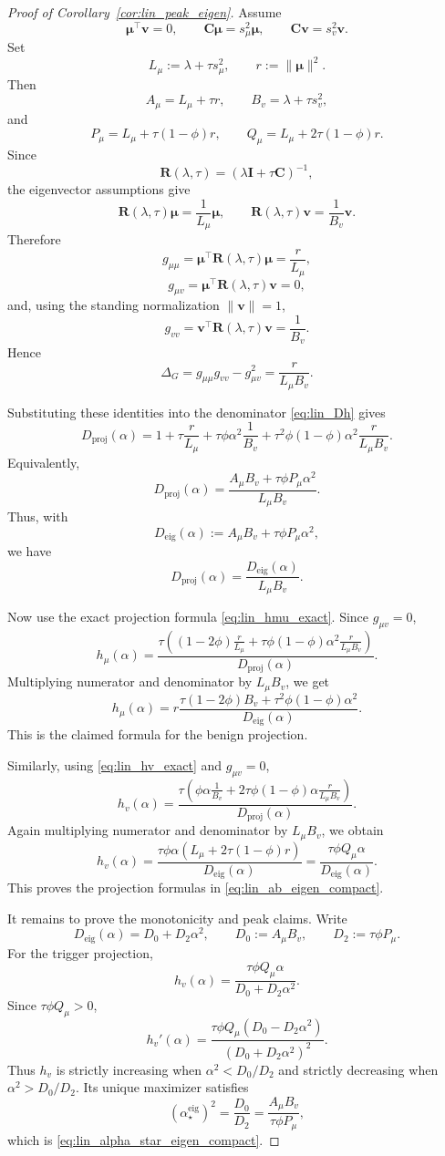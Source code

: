 \documentclass[10pt,a4paper]{amsart}
\newcommand{\C}{\mathbf{C}}
\newcommand{\I}{\mathbf{I}}
\newcommand{\bmu}{\boldsymbol{\mu}}
\newcommand{\bv}{\mathbf{v}}
\begin{document}
\begin{proof}[Proof of Corollary~\ref{cor:lin_peak_eigen}]
Assume
\[
\bmu^\top\bv=0,
\qquad
\C\bmu=s_\mu^2\bmu,
\qquad
\C\bv=s_v^2\bv.
\]
Set
\[
L_\mu:=\lambda+\tau s_\mu^2,
\qquad
r:=\|\bmu\|^2.
\]
Then
\[
A_\mu=L_\mu+\tau r,
\qquad
B_v=\lambda+\tau s_v^2,
\]
and
\[
P_\mu=L_\mu+\tau(1-\phi)r,
\qquad
Q_\mu=L_\mu+2\tau(1-\phi)r.
\]
Since
\[
\mathbf{R}(\lambda,\tau)=(\lambda\I+\tau\C)^{-1},
\]
the eigenvector assumptions give
\[
\mathbf{R}(\lambda,\tau)\bmu=\frac{1}{L_\mu}\bmu,
\qquad
\mathbf{R}(\lambda,\tau)\bv=\frac{1}{B_v}\bv.
\]
Therefore
\[
g_{\mu\mu}
=
\bmu^\top \mathbf{R}(\lambda,\tau)\bmu
=
\frac{r}{L_\mu},
\]
\[
g_{\mu v}
=
\bmu^\top \mathbf{R}(\lambda,\tau)\bv
=
0,
\]
and, using the standing normalization \(\|\bv\|=1\),
\[
g_{vv}
=
\bv^\top \mathbf{R}(\lambda,\tau)\bv
=
\frac{1}{B_v}.
\]
Hence
\[
\Delta_G=g_{\mu\mu}g_{vv}-g_{\mu v}^2
=
\frac{r}{L_\mu B_v}.
\]

Substituting these identities into the denominator
\eqref{eq:lin_Dh} gives
\[
D_{\mathrm{proj}}(\alpha)
=
1+\tau\frac{r}{L_\mu}
+
\tau\phi\alpha^2\frac{1}{B_v}
+
\tau^2\phi(1-\phi)\alpha^2\frac{r}{L_\mu B_v}.
\]
Equivalently,
\[
D_{\mathrm{proj}}(\alpha)
=
\frac{
A_\mu B_v+\tau\phi P_\mu\alpha^2
}
{L_\mu B_v}.
\]
Thus, with
\[
D_{\mathrm{eig}}(\alpha):=A_\mu B_v+\tau\phi P_\mu\alpha^2,
\]
we have
\[
D_{\mathrm{proj}}(\alpha)
=
\frac{D_{\mathrm{eig}}(\alpha)}{L_\mu B_v}.
\]

Now use the exact projection formula \eqref{eq:lin_hmu_exact}. Since
\(g_{\mu v}=0\),
\[
h_\mu(\alpha)
=
\frac{
\tau\left((1-2\phi)\frac{r}{L_\mu}
+
\tau\phi(1-\phi)\alpha^2\frac{r}{L_\mu B_v}\right)
}
{
D_{\mathrm{proj}}(\alpha)
}.
\]
Multiplying numerator and denominator by \(L_\mu B_v\), we get
\[
h_\mu(\alpha)
=
r
\frac{
\tau(1-2\phi)B_v+\tau^2\phi(1-\phi)\alpha^2
}
{
D_{\mathrm{eig}}(\alpha)
}.
\]
This is the claimed formula for the benign projection.

Similarly, using \eqref{eq:lin_hv_exact} and \(g_{\mu v}=0\),
\[
h_v(\alpha)
=
\frac{
\tau\left(
\phi\alpha\frac{1}{B_v}
+
2\tau\phi(1-\phi)\alpha\frac{r}{L_\mu B_v}
\right)
}
{
D_{\mathrm{proj}}(\alpha)
}.
\]
Again multiplying numerator and denominator by \(L_\mu B_v\), we obtain
\[
h_v(\alpha)
=
\frac{
\tau\phi\alpha
\left(L_\mu+2\tau(1-\phi)r\right)
}
{
D_{\mathrm{eig}}(\alpha)
}
=
\frac{
\tau\phi Q_\mu\alpha
}
{
D_{\mathrm{eig}}(\alpha)
}.
\]
This proves the projection formulas in \eqref{eq:lin_ab_eigen_compact}.

It remains to prove the monotonicity and peak claims. Write
\[
D_{\mathrm{eig}}(\alpha)=D_0+D_2\alpha^2,
\qquad
D_0:=A_\mu B_v,
\qquad
D_2:=\tau\phi P_\mu .
\]
For the trigger projection,
\[
h_v(\alpha)
=
\frac{\tau\phi Q_\mu\alpha}{D_0+D_2\alpha^2}.
\]
Since \(\tau\phi Q_\mu>0\),
\[
h_v'(\alpha)
=
\frac{
\tau\phi Q_\mu(D_0-D_2\alpha^2)
}
{
(D_0+D_2\alpha^2)^2
}.
\]
Thus \(h_v\) is strictly increasing when \(\alpha^2<D_0/D_2\) and strictly
decreasing when \(\alpha^2>D_0/D_2\). Its unique maximizer satisfies
\[
(\alpha_\star^{\mathrm{eig}})^2
=
\frac{D_0}{D_2}
=
\frac{A_\mu B_v}{\tau\phi P_\mu},
\]
which is \eqref{eq:lin_alpha_star_eigen_compact}.


\end{proof}
\end{document}
